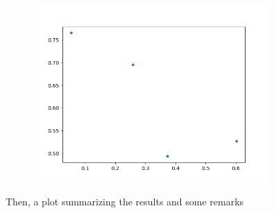 \documentclass[a4paper]{article}%
\begin{document}
\begin{figure}[H]%
\centering%
\includegraphics[width=0.8\textwidth]{files/plot_3.png}%
\end{figure}%
Then, a plot summarizing the results and some remarks

%
\end{document}
